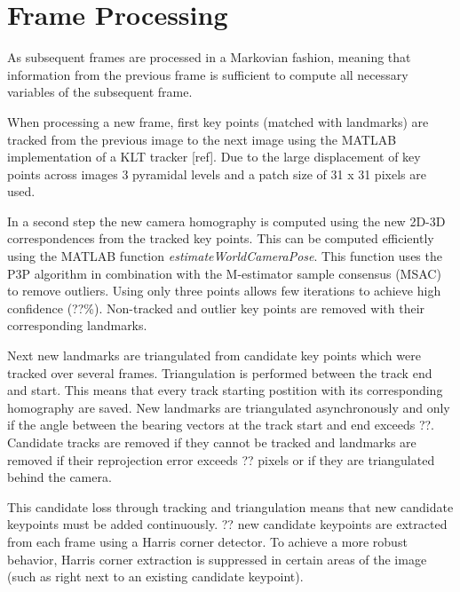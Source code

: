 \section{Frame Processing}
As subsequent frames are processed in a Markovian fashion, meaning that information from the previous frame is sufficient to compute all necessary variables of the subsequent frame. \par
When processing a new frame, first key points (matched with landmarks) are tracked from the previous image to the next image using the MATLAB implementation of a KLT tracker [ref]. Due to the large displacement of key points across images 3 pyramidal levels and a patch size of 31 x 31 pixels are used. \par
In a second step the new camera homography is computed using the new 2D-3D correspondences from the tracked key points. This can be computed efficiently using the MATLAB function \emph{estimateWorldCameraPose}. This function uses the P3P algorithm in combination with the M-estimator sample consensus (MSAC) to remove outliers. Using only three points allows few iterations to achieve high confidence (??\%). Non-tracked and outlier key points are removed with their corresponding landmarks.\par
Next new landmarks are triangulated from candidate key points which were tracked over several frames. Triangulation is performed between the track end and start. This means that every track starting postition with its corresponding homography are saved. New landmarks are triangulated asynchronously and only if the angle between the bearing vectors at the track start and end exceeds ??. Candidate tracks are removed if they cannot be tracked and landmarks are removed if their reprojection error exceeds ?? pixels or if they are triangulated behind the camera.\par
This candidate loss through tracking and triangulation means that new candidate keypoints must be added continuously. ?? new candidate keypoints are extracted from each frame using a Harris corner detector. To achieve a more robust behavior, Harris corner extraction is suppressed in certain areas of the image (such as right next to an existing candidate keypoint).
